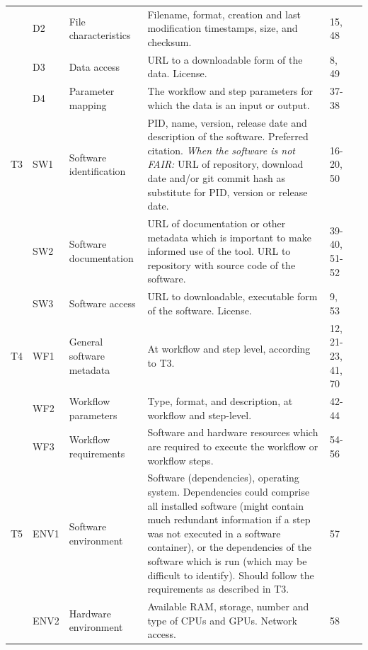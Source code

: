 \begin{table}
\begin{tabularx}{\linewidth}{p{0.1in}p{0.3in}p{1.3in}Lp{0.45in}p{0.3in}}
    & D2    & File characteristics              & Filename, format, creation and last modification timestamps, size, and checksum.  & 15, 48  &  \\
    & D3    & Data access                       & URL to a downloadable form of the data. License.   &  8, 49  & \\
    & D4    & Parameter mapping                 & The workflow and step parameters for which the data is an input or output.   & 37-38 &   \\
\midrule
T3  & SW1   & Software identification           & PID, name, version, release date and description of the software. Preferred citation. \textit{When the software is not FAIR:} URL of repository, download date and/or git commit hash as substitute for PID, version or release date.       &  16-20, 50     &   \citep{smithSoftwareCitationPrinciples2016} \\
    & SW2   & Software documentation            & URL of documentation or other metadata which is important to make informed use of the tool. URL to repository with source code of the software. &  39-40, 51-52  & \\
    & SW3   & Software access                   & URL to downloadable, executable form of the software. License.               &  9, 53  & \\
\midrule
T4  & WF1   & General software metadata         & At workflow and step level, according to T3.                 & 12, 21-23, 41, 70 & \citep{Goble2020}\\
    & WF2   & Workflow parameters               & Type, format, and description, at workflow and step-level.                & 42-44  & \\
    & WF3   & Workflow requirements             & Software and hardware resources which are required to execute the workflow or workflow steps. &  54-56  & \\
\midrule
T5  & ENV1  & Software environment              & Software (dependencies), operating system. Dependencies could comprise all installed software (might contain much redundant information if a step was not executed in a software container), or the dependencies of the software which is run (which may be difficult to identify). Should follow the requirements as described in T3.       &    57     &  \citep{committeeonreproducibilityandreplicabilityinscienceReproducibilityReplicabilityScience2019}  \\
    & ENV2  & Hardware environment              & Available RAM, storage, number and type of CPUs and GPUs. Network access.       &    58        & \\

\end{tabularx}
\end{table}

